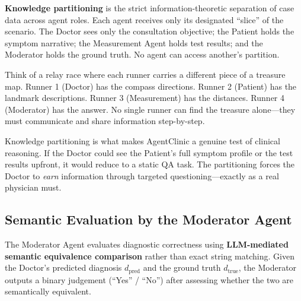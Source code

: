 \begin{acadbox}[\textcolor{white}{Academic Definition}]
\textbf{Knowledge partitioning} is the strict information-theoretic separation of case data across agent roles. Each agent receives only its designated ``slice'' of the scenario. The Doctor sees only the consultation objective; the Patient holds the symptom narrative; the Measurement Agent holds test results; and the Moderator holds the ground truth. No agent can access another's partition.
\end{acadbox}

\begin{analogybox}[\textcolor{white}{Simple Analogy}]
Think of a relay race where each runner carries a different piece of a treasure map. Runner 1 (Doctor) has the compass directions. Runner 2 (Patient) has the landmark descriptions. Runner 3 (Measurement) has the distances. Runner 4 (Moderator) has the answer. No single runner can find the treasure alone---they must communicate and share information step-by-step.
\end{analogybox}

\begin{mattersbox}[\textcolor{white}{Why It Matters for This Thesis}]
Knowledge partitioning is what makes AgentClinic a genuine test of clinical reasoning. If the Doctor could see the Patient's full symptom profile or the test results upfront, it would reduce to a static QA task. The partitioning forces the Doctor to \textit{earn} information through targeted questioning---exactly as a real physician must.
\end{mattersbox}

\subsection{Semantic Evaluation by the Moderator Agent}

\begin{acadbox}[\textcolor{white}{Academic Definition}]
The Moderator Agent evaluates diagnostic correctness using \textbf{LLM-mediated semantic equivalence comparison} rather than exact string matching. Given the Doctor's predicted diagnosis $d_{\text{pred}}$ and the ground truth $d_{\text{true}}$, the Moderator outputs a binary judgement (``Yes'' / ``No'') after assessing whether the two are semantically equivalent.
\end{acadbox}

